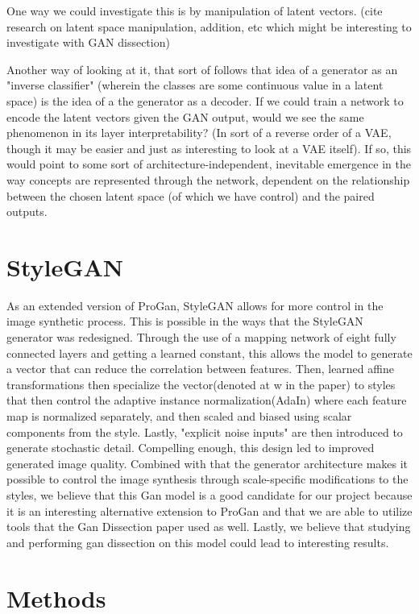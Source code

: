 \documentclass{article}
\begin{document}
One way we could investigate this is by manipulation of latent vectors. (cite research on latent space manipulation, addition, etc which might be interesting to investigate with GAN dissection)

Another way of looking at it, that sort of follows that idea of a generator as an "inverse classifier" (wherein the classes are some continuous value in a latent space) is the idea of a the generator as a decoder. If we could train a network to encode the latent vectors given the GAN output, would we see the same phenomenon in its layer interpretability? (In sort of a reverse order of a VAE, though it may be easier and just as interesting to look at a VAE itself). If so, this would point to some sort of architecture-independent, inevitable emergence in the way concepts are represented through the network, dependent on the relationship between the chosen latent space (of which we have control) and the paired outputs.

\section{StyleGAN}

As an extended version of ProGan, StyleGAN allows for more control in the image synthetic process. This is possible in the ways that the StyleGAN generator was redesigned. Through the use of a mapping network of eight fully connected layers and getting a learned constant, this allows the model to generate a vector that can reduce the correlation between features. Then, learned affine transformations then specialize the vector(denoted at w in the paper) to styles that then control the adaptive instance normalization(AdaIn) where each feature map is normalized separately, and then scaled and biased using scalar components from the style. Lastly, "explicit noise inputs" are then introduced to generate stochastic detail. Compelling enough, this design led to improved generated image quality. Combined with that the generator architecture makes it possible to control the image synthesis through scale-specific modifications to the styles, we believe that this Gan model is a good candidate for our project because it is an interesting alternative extension to ProGan and that we are able to utilize tools that the Gan Dissection paper used as well. Lastly, we believe that studying and performing gan dissection on this model could lead to interesting results.

\section{Methods}
\end{document}
